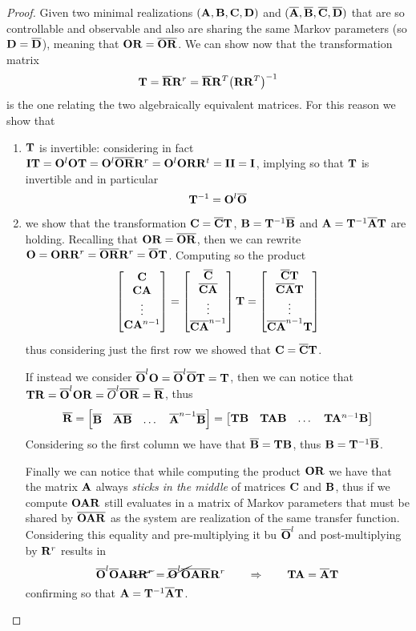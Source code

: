 	\begin{proof}
		Given two minimal realizations $(\A,\B,\C,\D)$ and $(\overline \A, \overline \B, \overline \C, \overline \D)$ that are so controllable and observable and also are sharing the same Markov parameters (so $\D=\overline \D$), meaning that $\O\R= \overline{\O\R}$. We can show now that the transformation matrix 
		\begin{equation}
			\T = \overline \R \R^r = \overline \R \R^T\big(\R\R^T\big)^{-1}
		\end{equation}
		is the one relating the two algebraically equivalent matrices. For this reason we show that
		\begin{enumerate}[\itshape a)]
			\item $\T$ is invertible: considering in fact $\I \T= \O^l\O\T = \O^l \overline \O \overline \R \R^r = \O^l \O\R \R^t = \I\I = \I$, implying so that $\T$ is invertible and in particular
			\[ \T^{-1} = \O^l \overline \O \]
			
			\item we show that the transformation $\C = \overline \C\T$, $\B = \T^{-1}\overline \B$ and $\A = \T^{-1}\overline \A \T$ are holding. Recalling that $\O\R = \overline{\O\R}$, then we can rewrite $\O = \O\R\R^r = \overline {\O\R} \R^r = \overline \O \T$. Computing so the product
			\[ \matrix{\C\\\C\A \\\vdots \\ \C\A^{n-1}} = \matrix{\overline \C \\ \overline{\C\A} \\ \vdots \\ \overline{\C\A}^{n-1}} \T = \matrix{\overline \C\T \\ \overline{\C\A}\T \\ \vdots \\ \overline{\C\A}^{n-1} \T} \]
			thus considering just the first row we showed that $\C = \overline \C\T$. 
			
			If instead we consider $\overline \O^l \O = \overline \O^l \overline \O \T = \T$, then we can notice that $\T\R= \overline \O^l \O\R= \overline O^l\overline {\O\R} = \overline \R$, thus
			\[ \overline \R = \matrix{\overline \B & \overline{\A\B} & \dots & \overline \A^{n-1} \overline \B} = \matrix{\T\B & \T\A\B & \dots &  \T\A^{n-1}\B} \]
			Considering so the first column we have that $\overline \B = \T\B$, thus $\B = \T^{-1}\overline \B$.
			
			Finally we can notice that while computing the product $\O\R$ we have that the matrix $\A$ always \textit{sticks in the middle} of matrices $\C$ and $\B$, thus if we compute $\O\A\R$ still evaluates in a matrix of Markov parameters that must be shared by $\overline{\O\A\R}$ as the system are realization of the same transfer function. Considering this equality and pre-multiplying it bu $\overline \O^l$ and post-multiplying by $\R^r$ results in
			\[ \overline \O^l \overline \O \A \cancel{\R\R^r} = \cancel{\overline \O^l \overline \O} \overline{\A\R} \R^r \qquad \Rightarrow \qquad \T\A = \overline \A \T \]
			confirming so that $\A = \T^{-1}\overline \A \T$.
		\end{enumerate}
	\end{proof}
	
	
	
	
	
	
	
	
	
	
	
	
	
	